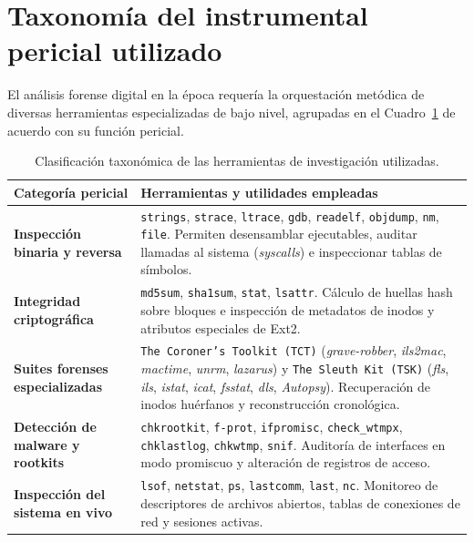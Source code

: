 \section{Taxonomía del instrumental pericial utilizado}

El análisis forense digital en la época requería la orquestación metódica de diversas herramientas especializadas de bajo nivel, agrupadas en el Cuadro~\ref{tab:herramientas_forenses} de acuerdo con su función pericial.

\begin{table}[htbp]
\centering
\small
\begin{tabularx}{\textwidth}{@{} p{3.8cm} X @{}}
\toprule
\textbf{Categoría pericial} & \textbf{Herramientas y utilidades empleadas} \\
\midrule
\textbf{Inspección binaria y reversa} & \texttt{strings}, \texttt{strace}, \texttt{ltrace}, \texttt{gdb}, \texttt{readelf}, \texttt{objdump}, \texttt{nm}, \texttt{file}. Permiten desensamblar ejecutables, auditar llamadas al sistema (\textit{syscalls}) e inspeccionar tablas de símbolos. \\
\addlinespace
\textbf{Integridad criptográfica} & \texttt{md5sum}, \texttt{sha1sum}, \texttt{stat}, \texttt{lsattr}. Cálculo de huellas hash sobre bloques e inspección de metadatos de inodos y atributos especiales de Ext2. \\
\addlinespace
\textbf{Suites forenses especializadas} & \texttt{The Coroner's Toolkit (TCT)} (\textit{grave-robber}, \textit{ils2mac}, \textit{mactime}, \textit{unrm}, \textit{lazarus}) y \texttt{The Sleuth Kit (TSK)} (\textit{fls}, \textit{ils}, \textit{istat}, \textit{icat}, \textit{fsstat}, \textit{dls}, \textit{Autopsy}). Recuperación de inodos huérfanos y reconstrucción cronológica. \\
\addlinespace
\textbf{Detección de malware y rootkits} & \texttt{chkrootkit}, \texttt{f-prot}, \texttt{ifpromisc}, \texttt{check\_wtmpx}, \texttt{chklastlog}, \texttt{chkwtmp}, \texttt{snif}. Auditoría de interfaces en modo promiscuo y alteración de registros de acceso. \\
\addlinespace
\textbf{Inspección del sistema en vivo} & \texttt{lsof}, \texttt{netstat}, \texttt{ps}, \texttt{lastcomm}, \texttt{last}, \texttt{nc}. Monitoreo de descriptores de archivos abiertos, tablas de conexiones de red y sesiones activas. \\
\bottomrule
\end{tabularx}
\caption{Clasificación taxonómica de las herramientas de investigación utilizadas.}
\label{tab:herramientas_forenses}
\end{table}


